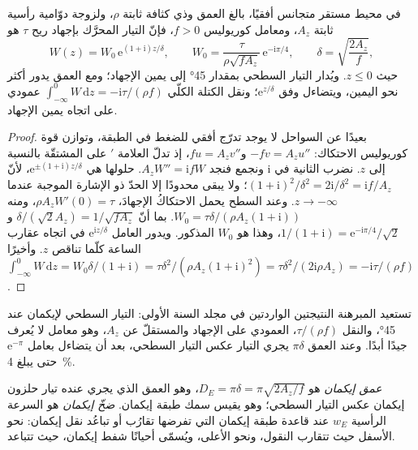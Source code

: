 \begin{theorem}\label{thm:b3:ocean-dynamics:ekman}
في محيط مستقر متجانس أفقيًا، بالغ العمق وذي كثافة ثابتة
$\rho$، ولزوجة دوّامية رأسية ثابتة $A_z$، ومعامل كوريوليس
$f > 0$، فإنّ التيار المحرَّك بإجهاد ريح $\tau$ هو
\[
W(z) = W_0\,\mathrm e^{(1+\mathrm i)z/\delta},\qquad
W_0 = \frac{\tau}{\rho\sqrt{fA_z}}\,\mathrm e^{-\mathrm i\pi/4},\qquad
\delta = \sqrt{\frac{2A_z}{f}} ,
\]
حيث $z \le 0$. ويُدار التيار السطحي بمقدار \ang{45} إلى يمين
الإجهاد؛ ومع العمق يدور أكثر نحو اليمين، ويتضاءل وفق $\mathrm
e^{z/\delta}$؛ ونقل الكتلة الكلّي $\int_{-\infty}^0 W\,\mathrm dz =
-\mathrm i\tau/(\rho f)$ عمودي على اتجاه يمين الإجهاد.
\end{theorem}

\begin{proof}
بعيدًا عن السواحل لا يوجد تدرّج أفقي للضغط في الطبقة،
وتوازن قوة كوريوليس الاحتكاك: $-fv = A_z u''$ و$fu =
A_z v''$، إذ تدلّ العلامة $'$ على المشتقّة بالنسبة إلى $z$. نضرب الثانية في
$\mathrm i$ ونجمع فنجد $A_zW'' = \mathrm ifW$. حلولها هي
$\mathrm e^{\pm(1+\mathrm i)z/\delta}$، لأنّ $(1+\mathrm i)^2/\delta^2 =
2\mathrm i/\delta^2 = \mathrm if/A_z$؛ ولا يبقى محدودًا إلا الحدّ ذو الإشارة الموجبة عندما
$z \to -\infty$. وعند السطح يحمل الاحتكاكُ الإجهادَ،
$\rho A_zW'(0) = \tau$، ومنه $W_0 = \tau\delta/(\rho A_z(1+\mathrm i))$.
بما أنّ $\delta/(\sqrt2 A_z) = 1/\sqrt{fA_z}$ و$1/(1+\mathrm i) = \mathrm
e^{-\mathrm i\pi/4}/\sqrt2$، وهذا هو $W_0$ المذكور. ويدور العامل
$\mathrm e^{\mathrm iz/\delta}$ في اتجاه عقارب الساعة كلّما تناقص $z$.
وأخيرًا $\int_{-\infty}^0 W\,\mathrm dz = W_0\delta/(1+\mathrm i) =
\tau\delta^2/(\rho A_z(1+\mathrm i)^2) = \tau\delta^2/(2\mathrm i\rho A_z)
= -\mathrm i\tau/(\rho f)$.
\end{proof}

تستعيد المبرهنة النتيجتين الواردتين في مجلد السنة الأولى: التيار السطحي لإيكمان
عند \ang{45}، والنقل $\tau/(\rho f)$، العمودي على
الإجهاد والمستقلّ عن $A_z$، وهو معامل لا يُعرف جيدًا أبدًا.
وعند العمق $\pi\delta$ يجري التيار عكس التيار السطحي، بعد أن يتضاءل
بعامل $\mathrm e^{-\pi}$ حتى يبلغ \qty{4}{\percent}.

\begin{definition}\label{def:b3:ocean-dynamics:ekman-pumping}
\emph{عمق إيكمان} هو $D_E = \pi\delta =
\pi\sqrt{2A_z/f}$، وهو العمق الذي يجري عنده تيار حلزون إيكمان
عكس التيار السطحي؛ وهو يقيس سمك
طبقة إيكمان. \emph{ضخّ إيكمان} هو السرعة الرأسية
$w_E$ عند قاعدة طبقة إيكمان التي تفرضها تقارُب أو
تباعُد نقل إيكمان: نحو الأسفل حيث تتقارب النقول،
ونحو الأعلى، ويُسمّى أحيانًا شفط إيكمان، حيث تتباعد.
\end{definition}

